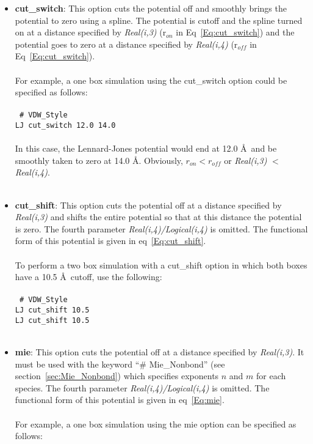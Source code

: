 \begin{itemize}
%
\item \textbf{cut\_switch}: This option cuts the potential off and smoothly
brings the potential to zero using a spline. The potential is cutoff
and the spline turned on at a distance specified by \emph{Real(i,3)}
(r$_{on}$ in Eq~\ref{Eq:cut_switch}) and the potential goes
to zero at a distance specified by \emph{Real(i,4)} (r$_{off}$ in
Eq~\ref{Eq:cut_switch}). \\ \\ 
% 
For example, a one box simulation using the cut\_switch option could be
specified as follows:
\\ \\
\texttt{
\# VDW\_Style \\
LJ cut\_switch 12.0 14.0} \\ \\
%
In this case, the Lennard-Jones potential would end at 12.0 \AA\ and
be smoothly taken to zero at 14.0 \AA. Obviously, $r_{on} < r_{off}$ or \emph{Real(i,3)} $<$ \emph{Real(i,4)}.
%
\\ \\
\item \textbf{cut\_shift}: This option cuts the potential off at a distance
specified by \emph{Real(i,3)} and shifts the entire potential so that
at this distance the potential is zero. The fourth parameter
\emph{Real(i,4)/Logical(i,4)} is omitted. The functional form of this
potential is given in eq~\ref{Eq:cut_shift}. \\ \\
%
To perform a two box simulation with a cut\_shift option in which both
boxes have a 10.5 \AA\ cutoff, use the following:
\\ \\
\texttt{
\# VDW\_Style \\
LJ cut\_shift 10.5 \\
LJ cut\_shift 10.5 } \\ \\
%
\item \textbf{mie}: This option cuts the potential off at a distance
specified by \emph{Real(i,3)}. It must be used with the keyword ``\# Mie\_Nonbond'' (see section~\ref{sec:Mie_Nonbond}) which specifies exponents $n$ and $m$ for each species. The fourth parameter
\emph{Real(i,4)/Logical(i,4)} is omitted. The functional form of this
potential is given in eq~\ref{Eq:mie}. \\ \\
%
For example, a one box simulation using the mie option can be specified as follows: \\ \\

\end{itemize}
